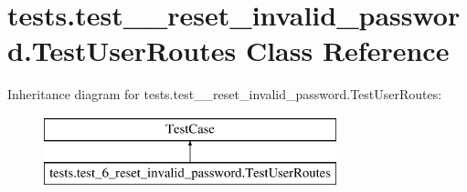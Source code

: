 \hypertarget{classtests_1_1test__6__reset__invalid__password_1_1_test_user_routes}{}\section{tests.\+test\+\_\+\_\+reset\+\_\+invalid\+\_\+password.\+Test\+User\+Routes Class Reference}
\label{classtests_1_1test__6__reset__invalid__password_1_1_test_user_routes}
Inheritance diagram for tests.\+test\+\_\+\_\+reset\+\_\+invalid\+\_\+password.\+Test\+User\+Routes\+:\begin{figure}[H]
\begin{center}
\leavevmode
\includegraphics[height=2.000000cm]{classtests_1_1test__6__reset__invalid__password_1_1_test_user_routes}
\end{center}
\end{figure}
